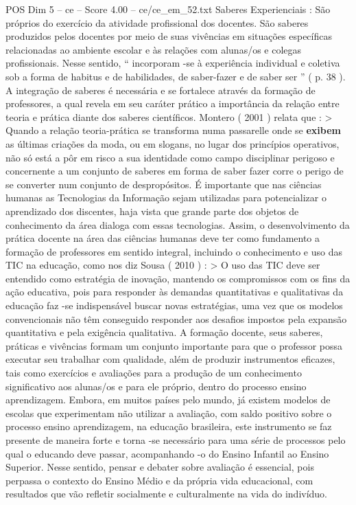 \begin{textsample}{POS Dim 5 – ce – Score 4.00 – ce/ce\_em\_52.txt}
Saberes Experienciais : São próprios do exercício da atividade profissional dos docentes.
São saberes produzidos pelos docentes por meio de suas vivências em situações específicas relacionadas ao ambiente escolar e às relações com alunas/os e colegas profissionais.
Nesse sentido, “ incorporam -se à experiência individual e coletiva sob a forma de habitus e de habilidades, de saber-fazer e de saber ser ” ( p. 38 ).
A integração de saberes é necessária e se fortalece através da formação de professores, a qual revela em seu caráter prático a importância da relação entre teoria e prática diante dos saberes científicos.
Montero ( 2001 ) relata que : > Quando a relação teoria-prática se transforma numa passarelle onde se \textbf{exibem} as últimas criações da moda, ou em slogans, no lugar dos princípios operativos, não só está a pôr em risco a sua identidade como campo disciplinar perigoso e concernente a um conjunto de saberes em forma de saber fazer corre o perigo de se converter num conjunto de despropósitos.
É importante que nas ciências humanas as Tecnologias da Informação sejam utilizadas para potencializar o aprendizado dos discentes, haja vista que grande parte dos objetos de conhecimento da área dialoga com essas tecnologias.
Assim, o desenvolvimento da prática docente na área das ciências humanas deve ter como fundamento a formação de professores em sentido integral, incluindo o conhecimento e uso das TIC na educação, como nos diz Sousa ( 2010 ) : > O uso das TIC deve ser entendido como estratégia de inovação, mantendo os compromissos com os fins da ação educativa, pois para responder às demandas quantitativas e qualitativas da educação faz -se indispensável buscar novas estratégias, uma vez que os modelos convencionais não têm conseguido responder aos desafios impostos pela expansão quantitativa e pela exigência qualitativa.
A formação docente, seus saberes, práticas e vivências formam um conjunto importante para que o professor possa executar seu trabalhar com qualidade, além de produzir instrumentos eficazes, tais como exercícios e avaliações para a produção de um conhecimento significativo aos alunas/os e para ele próprio, dentro do processo ensino aprendizagem.
Embora, em muitos países pelo mundo, já existem modelos de escolas que experimentam não utilizar a avaliação, com saldo positivo sobre o processo ensino aprendizagem, na educação brasileira, este instrumento se faz presente de maneira forte e torna -se necessário para uma série de processos pelo qual o educando deve passar, acompanhando -o do Ensino Infantil ao Ensino Superior.
Nesse sentido, pensar e debater sobre avaliação é essencial, pois perpassa o contexto do Ensino Médio e da própria vida educacional, com resultados que vão refletir socialmente e culturalmente na vida do indivíduo.

\end{textsample}
